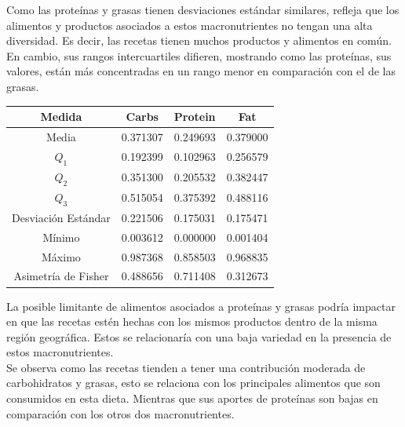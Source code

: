 \documentclass[12pt,a4paper]{article}
\begin{document}
            Como las proteínas y grasas tienen desviaciones estándar similares, refleja 
            que los alimentos y productos asociados a estos macronutrientes no tengan 
            una alta diversidad. Es decir, las recetas tienen muchos productos y alimentos 
            en común. En cambio, sus rangos intercuartiles difieren, mostrando como 
            las proteínas, sus valores, están más concentradas en un rango menor en 
            comparación con el de las grasas.

            \begin{center}
                \begin{tabular}{| c | c c c |}
                    \toprule
                    Medida & Carbs & Protein & Fat \\
                    \midrule
                    Media               & 0.371307 & 0.249693 & 0.379000  \\
                    $Q_1$               & 0.192399 & 0.102963 & 0.256579  \\
                    $Q_2$               & 0.351300 & 0.205532 & 0.382447  \\
                    $Q_3$               & 0.515054 & 0.375392 & 0.488116  \\
                    Desviación Estándar & 0.221506 & 0.175031 & 0.175471  \\
                    Mínimo              & 0.003612 & 0.000000 & 0.001404  \\
                    Máximo              & 0.987368 & 0.858503 & 0.968835  \\
                    Asimetría de Fisher & 0.488656 & 0.711408 & 0.312673  \\
                    \bottomrule
                \end{tabular}
            \end{center}

            La posible limitante de alimentos asociados a proteínas	y grasas 
            podría impactar en que las recetas estén hechas con los mismos productos 
            dentro de la misma región geográfica. Estos se relacionaría con una 
            baja variedad en la presencia de estos macronutrientes.\\

            Se observa como las recetas tienden a tener una contribución moderada de 
            carbohidratos y grasas, esto se relaciona con los principales alimentos 
            que son consumidos en esta dieta. Mientras que sus aportes de proteínas 
            son bajas en comparación con los otros dos macronutrientes.
            
\end{document}
